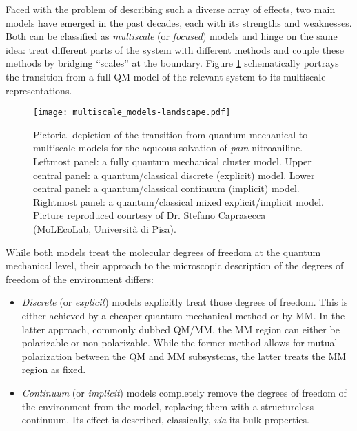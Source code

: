 Faced with the problem of describing such a diverse array of effects,
two main models have emerged in the past decades, each with its
strengths and weaknesses.
Both can be classified as \emph{multiscale} (or \emph{focused})
models\autocite{Nobel2013} and hinge on the same idea: treat different
parts of the system with different methods and couple these methods by
bridging \enquote{scales} at the boundary.
Figure \ref{fig:qm-to-multiscale} schematically portrays the transition
from a full \acrshort{QM} model of the relevant system to its multiscale
representations.

\begin{figure}[tb]
\centering
\texttt{[image: multiscale\_models-landscape.pdf]}
\caption[From quantum mechanical to multiscale models]{
Pictorial depiction of the transition from quantum mechanical to
multiscale models for the aqueous solvation of \emph{para}-nitroaniline.
Leftmost panel: a fully quantum mechanical cluster model.
Upper central panel: a quantum/classical discrete (explicit) model.
Lower central panel: a quantum/classical continuum (implicit) model.
Rightmost panel: a quantum/classical mixed explicit/implicit model.
Picture reproduced courtesy of Dr. Stefano Caprasecca
(MoLEcoLab, Università di Pisa).}
\label{fig:qm-to-multiscale}
\end{figure}

While both models treat the molecular degrees of freedom at the
quantum
mechanical level, their approach to the microscopic description of the
degrees of freedom of the environment differs:
\begin{itemize}
 \item
   \emph{Discrete} (or \emph{explicit}) models explicitly treat those
   degrees of freedom.
   This is either achieved by a cheaper quantum mechanical
   method\autocite{Vreven2006-gx} or by \gls{MM}.\autocite{Senn2009-sk}
   In the latter approach, commonly dubbed \acrshort{QM}/\acrshort{MM}, the \acrshort{MM}
   region can either be polarizable\autocite{Mennucci2013-go,
   Olsen2010-wa, Lipparini2011-rd} or non
   polarizable. While the former method allows for mutual polarization
   between the \acrshort{QM} and \acrshort{MM} subsystems, the latter
   treats the \acrshort{MM} region as fixed.
 \item
   \emph{Continuum} (or \emph{implicit}) models completely remove the degrees
   of freedom of the environment from the model, replacing them with a
   structureless continuum.
   Its effect is described, classically, \emph{via} its bulk
   properties.\autocite{Onsager1936-wf, Miertus1981-mm}
\end{itemize}

